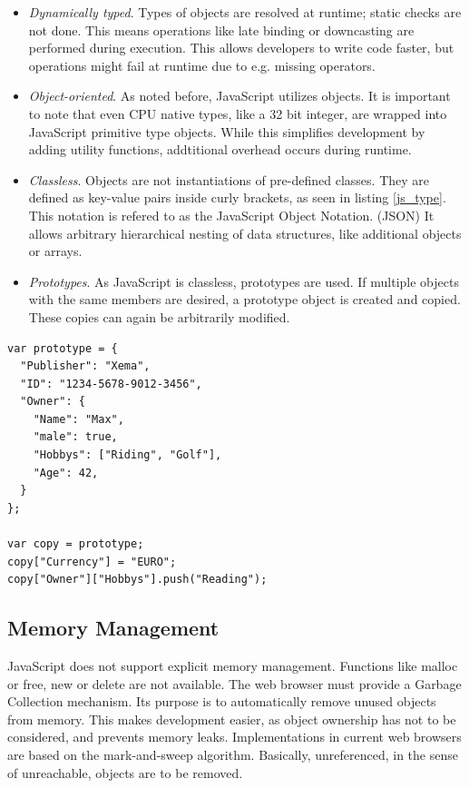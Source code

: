 \begin{itemize}

\item \textit{Dynamically typed}. Types of objects are resolved at runtime; static checks are not done. This means operations like late binding or downcasting are performed during execution. This allows developers to write code faster, but operations might fail at runtime due to e.g. missing operators.

\item \textit{Object-oriented}. As noted before, JavaScript utilizes objects. It is important to note that even CPU native types, like a 32 bit integer, are wrapped into JavaScript primitive type objects. While this simplifies development by adding utility functions, addtitional overhead occurs during runtime.

\item \textit{Classless}. Objects are not instantiations of pre-defined classes. They are defined as key-value pairs inside curly brackets, as seen in listing \ref{js_type}. This notation is refered to as the JavaScript Object Notation. (JSON) It allows arbitrary hierarchical nesting of data structures, like additional objects or arrays.

\item \textit{Prototypes}. As JavaScript is classless, prototypes are used. If multiple objects with the same members are desired, a prototype object is created and copied. These copies can again be arbitrarily modified.

\end{itemize}

\begin{lstlisting}[frame=single,basicstyle=\footnotesize]
var prototype = {
  "Publisher": "Xema",
  "ID": "1234-5678-9012-3456",
  "Owner": {
    "Name": "Max",
    "male": true,
    "Hobbys": ["Riding", "Golf"],
    "Age": 42,
  }
};

var copy = prototype;
copy["Currency"] = "EURO";
copy["Owner"]["Hobbys"].push("Reading");
\end{lstlisting}


\subsection{Memory Management}

JavaScript does not support explicit memory management. Functions like malloc or free, new or delete are not available. The web browser must provide a Garbage Collection mechanism. Its purpose is to automatically remove unused objects from memory. This makes development easier, as object ownership has not to be considered, and prevents memory leaks. Implementations in current web browsers are based on the mark-and-sweep algorithm. Basically, unreferenced, in the sense of unreachable, objects are to be removed. 

